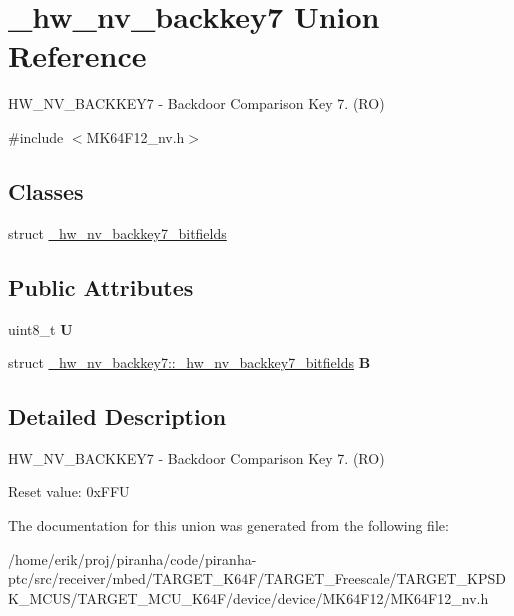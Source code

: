 \hypertarget{union__hw__nv__backkey7}{}\section{\+\_\+hw\+\_\+nv\+\_\+backkey7 Union Reference}
\label{union__hw__nv__backkey7}


H\+W\+\_\+\+N\+V\+\_\+\+B\+A\+C\+K\+K\+E\+Y7 -\/ Backdoor Comparison Key 7. (RO)  




{\ttfamily \#include $<$M\+K64\+F12\+\_\+nv.\+h$>$}

\subsection*{Classes}
\begin{DoxyCompactItemize}
\item 
struct \hyperlink{struct__hw__nv__backkey7_1_1__hw__nv__backkey7__bitfields}{\+\_\+hw\+\_\+nv\+\_\+backkey7\+\_\+bitfields}
\end{DoxyCompactItemize}
\subsection*{Public Attributes}
\begin{DoxyCompactItemize}
\item 
uint8\+\_\+t {\bfseries U}\hypertarget{union__hw__nv__backkey7_a812811a23efdca1616dadcf9cf6bdc4a}{}\label{union__hw__nv__backkey7_a812811a23efdca1616dadcf9cf6bdc4a}

\item 
struct \hyperlink{struct__hw__nv__backkey7_1_1__hw__nv__backkey7__bitfields}{\+\_\+hw\+\_\+nv\+\_\+backkey7\+::\+\_\+hw\+\_\+nv\+\_\+backkey7\+\_\+bitfields} {\bfseries B}\hypertarget{union__hw__nv__backkey7_a0353a546a91762dcc114fe56fca61fc2}{}\label{union__hw__nv__backkey7_a0353a546a91762dcc114fe56fca61fc2}

\end{DoxyCompactItemize}


\subsection{Detailed Description}
H\+W\+\_\+\+N\+V\+\_\+\+B\+A\+C\+K\+K\+E\+Y7 -\/ Backdoor Comparison Key 7. (RO) 

Reset value\+: 0x\+F\+FU 

The documentation for this union was generated from the following file\+:\begin{DoxyCompactItemize}
\item 
/home/erik/proj/piranha/code/piranha-\/ptc/src/receiver/mbed/\+T\+A\+R\+G\+E\+T\+\_\+\+K64\+F/\+T\+A\+R\+G\+E\+T\+\_\+\+Freescale/\+T\+A\+R\+G\+E\+T\+\_\+\+K\+P\+S\+D\+K\+\_\+\+M\+C\+U\+S/\+T\+A\+R\+G\+E\+T\+\_\+\+M\+C\+U\+\_\+\+K64\+F/device/device/\+M\+K64\+F12/M\+K64\+F12\+\_\+nv.\+h\end{DoxyCompactItemize}
